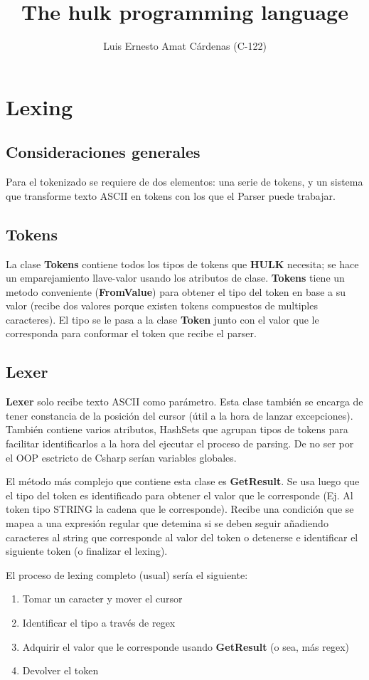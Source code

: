 \documentclass{report}
\title{The hulk programming language}
\author{Luis Ernesto Amat Cárdenas (C-122)}
\begin{document}
\maketitle

\tableofcontents

\chapter{Lexing}
\section{Consideraciones generales}
Para el tokenizado se requiere de dos elementos: una serie de tokens, y un sistema que transforme texto ASCII en tokens con los que el Parser puede trabajar.

\section{Tokens}
La clase \textbf{Tokens} contiene todos los tipos de tokens que \textbf{HULK} necesita; se hace un emparejamiento llave-valor usando los atributos de clase. \textbf{Tokens} tiene un metodo conveniente (\textbf{FromValue}) para obtener el tipo del token en base a su valor (recibe dos valores porque existen tokens compuestos de multiples caracteres).
El tipo se le pasa a la clase \textbf{Token} junto con el valor que le corresponda para conformar el token que recibe el parser.
\section{Lexer}
\textbf{Lexer} solo recibe texto ASCII como parámetro. Esta clase también se encarga de tener constancia de la posición del cursor (útil a la hora de lanzar excepciones).
También contiene varios atributos, HashSets que agrupan tipos de tokens para facilitar identificarlos a la hora del ejecutar el proceso de parsing. De no ser por el OOP esctricto de Csharp serían variables globales.

El método más complejo que contiene esta clase es \textbf{GetResult}. Se usa luego que el tipo del token es identificado para obtener el valor que le corresponde (Ej. Al token tipo STRING la cadena que le corresponde). Recibe una condición que se mapea a una expresión regular que detemina si se deben seguir añadiendo caracteres al string que corresponde al valor del token o detenerse e identificar el siguiente token (o finalizar el lexing).

El proceso de lexing completo (usual) sería el siguiente:
\begin{enumerate}
    \item{Tomar un caracter y mover el cursor}
    \item{Identificar el tipo a través de regex}
    \item{Adquirir el valor que le corresponde usando \textbf{GetResult} (o sea, más regex)}
    \item{Devolver el token}
\end{enumerate}
\end{document}
